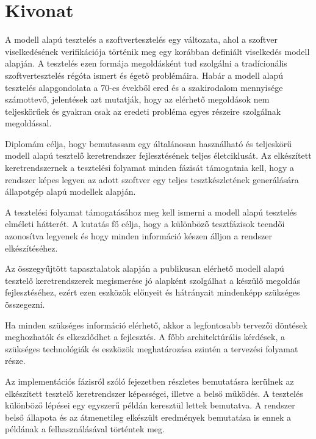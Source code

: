 \setcounter{page}{1}

\hungarianParagraph


\chapter*{Kivonat}
\label{cha:kivonat}

A modell alapú tesztelés a szoftvertesztelés egy változata, ahol a szoftver viselkedésének verifikációja történik meg egy korábban definiált viselkedés modell alapján. A tesztelés ezen formája megoldásként tud szolgálni a tradícionális szoftvertesztelés régóta ismert és égető problémáira. Habár a modell alapú tesztelés alapgondolata a 70-es évekből ered és a szakirodalom mennyisége számottevő, jelentések azt mutatják, hogy az elérhető megoldások nem teljeskörűek és gyakran csak az eredeti probléma egyes részeire szolgálnak megoldással.

Diplomám célja, hogy bemutassam egy általánosan használható és teljeskörű modell alapú tesztelő keretrendszer fejlesztésének teljes életciklusát. Az elkészített keretrendszernek a tesztelési folyamat minden fázisát támogatnia kell, hogy a rendszer képes legyen az adott szoftver egy teljes tesztkészletének generálására állapotgép alapú modellek alapján.

A tesztelési folyamat támogatásához meg kell ismerni a modell alapú tesztelés elméleti hátterét. A kutatás fő célja, hogy a különböző tesztfázisok teendői azonosítva legyenek és hogy minden információ készen álljon a rendszer elkészítéséhez.

Az összegyűjtött tapasztalatok alapján a publikusan elérhető modell alapú tesztelő keretrendszerek megismerése jó alapként szolgálhat a készülő megoldás fejlesztéséhez, ezért ezen eszközök előnyeit és hátrányait mindenképp szükséges összegezni.

Ha minden szükséges információ elérhető, akkor a legfontosabb tervezői döntések meghozhatók és elkezdődhet a fejlesztés. A főbb architektúrális kérdések, a szükséges technológiák és eszközök meghatározása szintén a tervezési folyamat része.

Az implementációs fázisról szóló fejezetben részletes bemutatásra kerülnek az elkészített tesztelő keretrendszer képességei, illetve a belső működés. A tesztelés különböző lépései egy egyszerű példán keresztül lettek bemutatva. A rendszer belső állapota és az átmenetileg elkészült eredmények bemutatása is ennek a példának a felhasználásával történtek meg.

